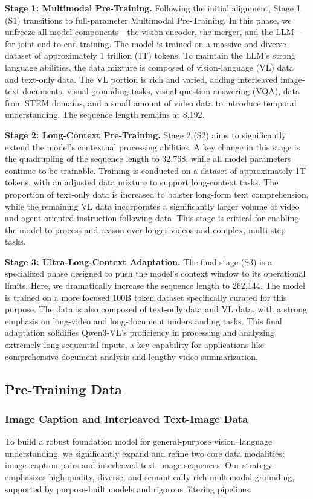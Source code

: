 \documentclass{article} %
\begin{document}
\textbf{Stage 1: Multimodal Pre-Training.} Following the initial alignment, Stage 1 (S1) transitions to full-parameter Multimodal Pre-Training. In this phase, we unfreeze all model components—the vision encoder, the merger, and the LLM—for joint end-to-end training. The model is trained on a massive and diverse dataset of approximately 1 trillion (1T) tokens. To maintain the LLM's strong language abilities, the data mixture is composed of vision-language (VL) data and text-only data. The VL portion is rich and varied, adding interleaved image-text documents, visual grounding tasks, visual question answering (VQA), data from STEM domains, and a small amount of video data to introduce temporal understanding. The sequence length remains at 8,192.

\textbf{Stage 2: Long-Context Pre-Training.} Stage 2 (S2) aims to significantly extend the model's contextual processing abilities. A key change in this stage is the quadrupling of the sequence length to 32,768, while all model parameters continue to be trainable. Training is conducted on a dataset of approximately 1T tokens, with an adjusted data mixture to support long-context tasks. The proportion of text-only data is increased to bolster long-form text comprehension, while the remaining VL data incorporates a significantly larger volume of video and agent-oriented instruction-following data. This stage is critical for enabling the model to process and reason over longer videos and complex, multi-step tasks.


\textbf{Stage 3: Ultra-Long-Context Adaptation.} The final stage (S3) is a specialized phase designed to push the model's context window to its operational limits. Here, we dramatically increase the sequence length to 262,144. The model is trained on a more focused 100B token dataset specifically curated for this purpose. The data is also composed of text-only data and VL data, with a strong emphasis on long-video and long-document understanding tasks. This final adaptation solidifies Qwen3-VL's proficiency in processing and analyzing extremely long sequential inputs, a key capability for applications like comprehensive document analysis and lengthy video summarization.

\subsection{Pre-Training Data}
\subsubsection{Image Caption and Interleaved Text-Image Data}
To build a robust foundation model for general-purpose vision–language understanding, we significantly expand and refine two core data modalities: image–caption pairs and interleaved text–image sequences. Our strategy emphasizes high-quality, diverse, and semantically rich multimodal grounding, supported by purpose-built models and rigorous filtering pipelines.
\end{document}
